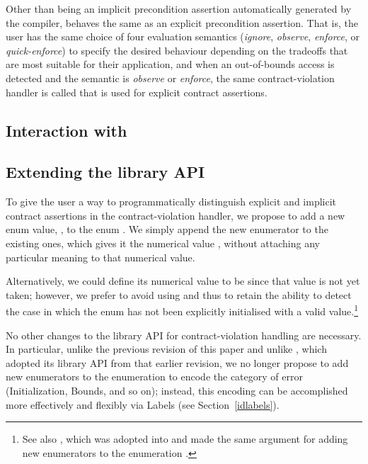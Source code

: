 Other than being an implicit precondition assertion automatically generated by the compiler,  behaves the same as an explicit precondition assertion. That is, the user has the same choice of four evaluation semantics (\emph{ignore}, \emph{observe}, \emph{enforce}, or \emph{quick-enforce}) to specify the desired behaviour depending on the tradeoffs that are most suitable for their application, and when an out-of-bounds access is detected and the semantic is \emph{observe} or \emph{enforce}, the same contract-violation handler is called that is used for explicit contract assertions.

\subsection{Interaction with }


\subsection{Extending the library API}
\label{library}

To give the user a way to programmatically distinguish explicit and implicit contract assertions in the contract-violation handler, we propose to add a new enum value, , to the enum \mbox{}. We simply append the new enumerator to the existing ones, which gives it the numerical value , without attaching any particular meaning to that numerical value.

Alternatively, we could define its numerical value to be  since that value is not yet taken; however, we prefer to avoid using  and thus to retain the ability to detect the case in which the enum has not been explicitly initialised with a valid value.\footnote{See also \cite{P3227R0}, which was adopted into \cite{P2900R14} and made the same argument for adding new enumerators to the enumeration .}

No other changes to the library API for contract-violation handling are necessary. In particular, unlike the previous revision of this paper and unlike \cite{P3081R1}, which adopted its library API from that earlier revision, we no longer propose to add new enumerators to the enumeration \mbox{} to encode the category of error (Initialization, Bounds, and so on); instead, this encoding can be accomplished more effectively and flexibly via Labels (see Section~\ref{idlabels}).


